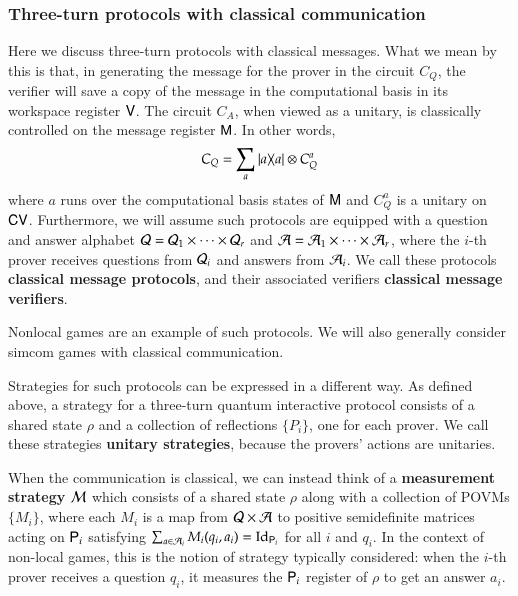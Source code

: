 \subsubsection{Three-turn protocols with classical communication}

Here we discuss three-turn protocols with classical messages. What we mean by this is that, in generating the message for the prover in the circuit $C_Q$, the verifier will save a copy of the message in the computational basis in its workspace register ${\mathsf{V}}$. The circuit $C_A$, when viewed as a unitary, is classically controlled on the message register ${\mathsf{M}}$. In other words, 
\[
	C_Q = \sum_{a} |a\rangle\! \langle a| \otimes C_Q^a 
\]
where $a$ runs over the computational basis states of ${\mathsf{M}}$ and $C_Q^a$ is a unitary on ${\mathsf{C}} {\mathsf{V}}$. Furthermore, we will assume such protocols are equipped with a question and answer alphabet $\mathcal Q = \mathcal Q_1 \times \cdots \times \mathcal Q_r$ and $\mathcal A = \mathcal A_1 \times \cdots \times \mathcal A_r$, where the $i$-th prover receives questions from $\mathcal Q_i$ and answers from $\mathcal A_i$. We call these protocols \textbf{classical message protocols}, and their associated verifiers \textbf{classical message verifiers}.

Nonlocal games are an example of such protocols. We will also generally consider simcom games with classical communication. 

Strategies for such protocols can be expressed in a different way. As defined above, a strategy for a three-turn quantum interactive protocol consists of a shared state $\rho$ and a collection of reflections $\{ P_i \}$, one for each prover. We call these strategies \textbf{unitary strategies}, because the provers' actions are unitaries.

When the communication is classical, we can instead think of a \textbf{measurement strategy} $\mathcal M$ which consists of a shared state $\rho$ along with a collection of POVMs $\{M_i\}$, where each $M_i$ is a map from $\mathcal Q \times \mathcal A$ to positive semidefinite matrices acting on ${\mathsf{P}}_i$ satisfying $\sum_{a \in \mathcal A_i} M_i(q_i,a_i) = \mathop{\mathrm{Id}}\!\mathinner{}_{{\mathsf{P}}_i}$ for all $i$ and $q_i$. In the context of non-local games, this is the notion of strategy typically considered: when the $i$-th prover receives a question $q_i$, it measures the ${\mathsf{P}}_i$ register of $\rho$ to get an answer $a_i$. 

